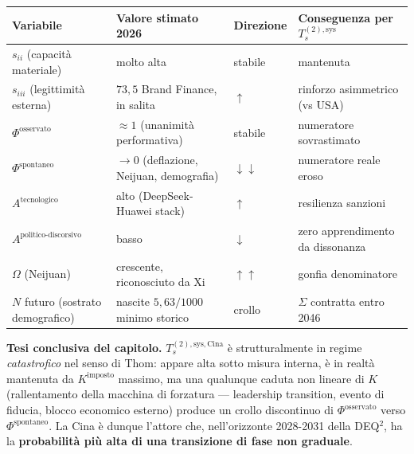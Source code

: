 {\def\LTcaptype{none} %
{\small\begin{longtable}[]{@{}
  >{\raggedright\arraybackslash}p{}
  >{\raggedright\arraybackslash}p{}
  >{\raggedright\arraybackslash}p{}
  >{\raggedright\arraybackslash}p{}@{}}
\toprule\noalign{}
\begin{minipage}[b]{\linewidth}\raggedright
Variabile
\end{minipage} & \begin{minipage}[b]{\linewidth}\raggedright
Valore stimato 2026
\end{minipage} & \begin{minipage}[b]{\linewidth}\raggedright
Direzione
\end{minipage} & \begin{minipage}[b]{\linewidth}\raggedright
Conseguenza per \(T_s^{(2),\text{sys}}\)
\end{minipage} \\
\midrule\noalign{}
\endhead
\bottomrule\noalign{}
\endlastfoot
\(s_{ii}\) (capacità materiale) & molto alta & stabile & mantenuta \\
\(s_{iii}\) (legittimità esterna) & \(73{,}5\) Brand Finance, in salita
& \(\uparrow\) & rinforzo asimmetrico (vs USA) \\
\(\Phi^{\text{osservato}}\) & \(\approx 1\) (unanimità performativa) &
stabile & numeratore sovrastimato \\
\(\Phi^{\text{spontaneo}}\) & \(\to 0\) (deflazione, Neijuan,
demografia) & \(\downarrow\downarrow\) & numeratore reale eroso \\
\(A^{\text{tecnologico}}\) & alto (DeepSeek-Huawei stack) & \(\uparrow\)
& resilienza sanzioni \\
\(A^{\text{politico-discorsivo}}\) & basso & \(\downarrow\) & zero
apprendimento da dissonanza \\
\(\Omega\) (Neijuan) & crescente, riconosciuto da Xi &
\(\uparrow\uparrow\) & gonfia denominatore \\
\(N\) futuro (sostrato demografico) & nascite \(5{,}63/1000\) minimo
storico & crollo & \(\Sigma\) contratta entro 2046 \\
\end{longtable}}
}

\Hypoth{} \textbf{Tesi conclusiva del capitolo.}
\(T_s^{(2),\text{sys},\text{Cina}}\) è strutturalmente in regime
\emph{catastrofico} nel senso di Thom: appare alta sotto misura interna,
è in realtà mantenuta da \(K^{\text{imposto}}\) massimo, ma una
qualunque caduta non lineare di \(K\) (rallentamento della macchina di
forzatura --- leadership transition, evento di fiducia, blocco economico
esterno) produce un crollo discontinuo di \(\Phi^{\text{osservato}}\)
verso \(\Phi^{\text{spontaneo}}\). La Cina è dunque l'attore che,
nell'orizzonte 2028-2031 della DEQ$^2$, ha la \textbf{probabilità più alta
di una transizione di fase non graduale}.

